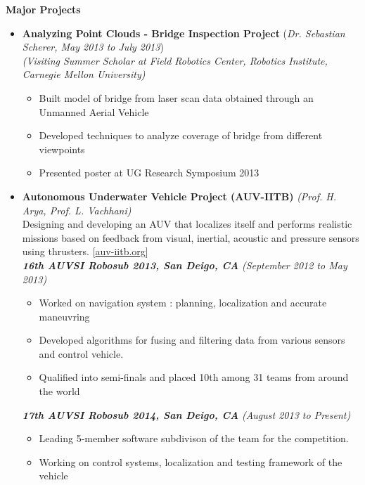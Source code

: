 \documentclass[a4paper,11pt]{article}
\newcommand{\resheading}[1]{{\small \colorbox{mygrey}{\begin{minipage}{0.975\textwidth}{\textbf{#1 \vphantom{p\^{E}}}}\end{minipage}}}}
\begin{document}
\resheading{\textbf{\large{Major Projects}}}
\begin{itemize}

    \item \textbf{Analyzing Point Clouds - Bridge Inspection Project} \hfill (\emph{Dr. Sebastian Scherer, May 2013 to July 2013}) \\
        \emph{(Visiting Summer Scholar at Field Robotics Center, Robotics Institute, Carnegie Mellon University)} \\[-0.6cm]
        \begin{itemize}
            \item Built model of bridge from laser scan data obtained through an Unmanned Aerial Vehicle
            \item Developed techniques to analyze coverage of bridge from different viewpoints
            \item Presented poster at UG Research Symposium 2013
        \end{itemize}

    \item \textbf{Autonomous Underwater Vehicle Project (AUV-IITB)} \hfill \emph{(Prof. H. Arya, Prof. L. Vachhani)} \\
        Designing and developing an AUV that localizes itself and performs realistic missions based on feedback from visual, inertial, acoustic and pressure sensors using thrusters. \hfill  [\href{http://auv-iitb.org}{auv-iitb.org}] \\[0.1cm]
        \textbf{\emph{16th AUVSI Robosub 2013, San Deigo, CA}} \hfill \emph{(September 2012 to May 2013) } \\[-0.6cm]
        \begin{itemize}
            \item Worked on navigation system : planning, localization and accurate maneuvring
            \item Developed algorithms for fusing and filtering data from various sensors and control vehicle.
            \item Qualified into semi-finals and placed 10th among 31 teams from around the world
        \end{itemize}
        \textbf{\emph{17th AUVSI Robosub 2014, San Deigo, CA}} \hfill \emph{(August 2013 to Present) } \\[-0.6cm]
        \begin{itemize}
            \item Leading 5-member software subdivison of the team for the competition.
            \item Working on control systems, localization and testing framework of the vehicle
        \end{itemize}


\end{itemize}
\end{document}
